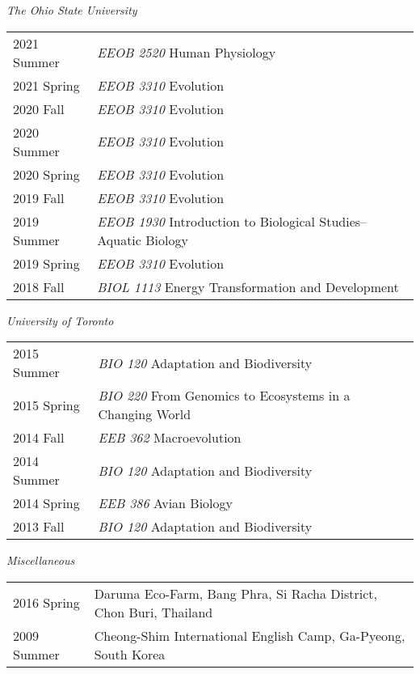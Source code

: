 \documentclass[11pt]{article}
\begin{document}
\textit{The Ohio State University}\\
\begin{longtable}{p{}  p{}}

2021 Summer & \textit{EEOB 2520} Human Physiology\\
2021 Spring & \textit{EEOB 3310} Evolution\\
2020 Fall & \textit{EEOB 3310} Evolution\\
2020 Summer & \textit{EEOB 3310} Evolution\\
2020 Spring & \textit{EEOB 3310} Evolution\\
2019 Fall & \textit{EEOB 3310} Evolution\\
2019 Summer & \textit{EEOB 1930} Introduction to Biological Studies--Aquatic Biology\\
2019 Spring & \textit{EEOB 3310} Evolution\\
2018 Fall & \textit{BIOL 1113} Energy Transformation and Development\\
\end{longtable}


\textit{University of Toronto}\\
\begin{longtable}{p{}  p{}}

2015 Summer  & \textit{BIO 120} Adaptation and Biodiversity\\
2015 Spring & \textit{BIO 220} From Genomics to Ecosystems in a Changing World\\
2014 Fall & \textit{EEB 362} Macroevolution\\
2014 Summer & \textit{BIO 120} Adaptation and Biodiversity\\
2014 Spring & \textit{EEB 386} Avian Biology\\
2013 Fall & \textit{BIO 120} Adaptation and Biodiversity\\

\end{longtable}

\textit{Miscellaneous}\\
\begin{longtable}{p{}  p{}}
2016 Spring & Daruma Eco-Farm, Bang Phra, Si Racha District, Chon Buri, Thailand\\
2009 Summer & Cheong-Shim International English Camp, Ga-Pyeong, South Korea\\
\end{longtable}

\hspace{0pt}
\end{document}
